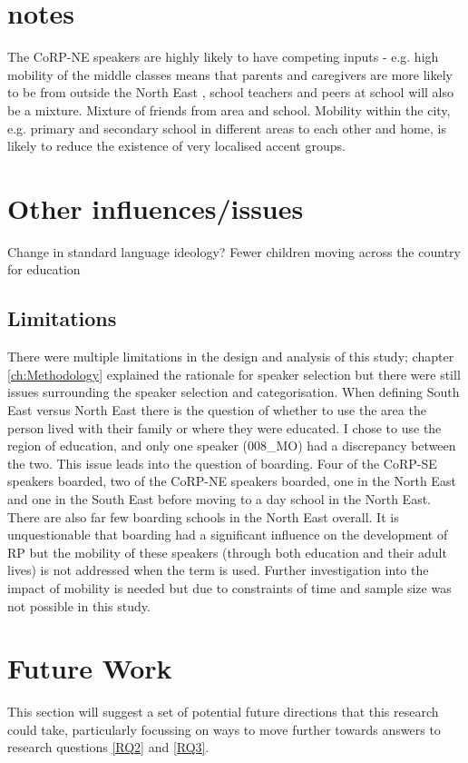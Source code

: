 \documentclass[../../00.FullDoc/tex/ThesisSkeleton-draft2]{subfiles}
\begin{document}
\section{notes}
The CoRP-NE speakers are highly likely to have competing inputs - e.g. high mobility of the middle classes means that parents and caregivers are more likely to be from outside the North East , school teachers and peers at school will also be a mixture.
Mixture of friends from area and school. 
Mobility within the city, e.g. primary and secondary school in different areas to each other and home, is likely to reduce the existence of very localised accent groups. 

\section{Other influences/issues}
Change in standard language ideology?
Fewer children moving across the country for education

\subsection{Limitations}
There were multiple limitations in the design and analysis of this study; chapter \ref{ch:Methodology} explained the rationale for speaker selection but there were still issues surrounding the speaker selection and categorisation. 
When defining South East versus North East there is the question of whether to use the area the person lived with their family or where they were educated. I chose to use the region of education, and only one speaker (008\_MO) had a discrepancy between the two. This issue leads into the question of boarding. Four of the CoRP-SE speakers boarded, two of the CoRP-NE speakers boarded, one in the North East and one in the South East before moving to a day school in the North East. There are also far few boarding schools in the North East overall. It is unquestionable that boarding had a significant influence on the development of RP but the mobility of these speakers (through both education and their adult lives) is not addressed when the term  is used. Further investigation into the impact of mobility is needed but due to constraints of time and sample size was not possible in this study.

\section{Future Work} \label{disc:future}
This section will suggest a set of potential future directions that this research could take, particularly focussing on ways to move further towards answers to research questions \ref{RQ2} and \ref{RQ3}.
\end{document}
